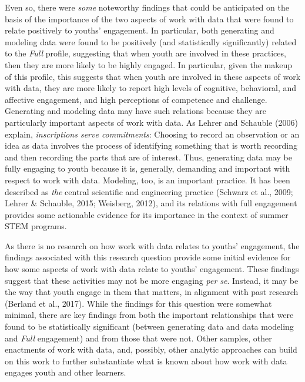 \documentclass[]{msu-thesis}
\theoremstyle{definition}
\theoremstyle{definition}
\theoremstyle{definition}
\theoremstyle{remark}
\begin{document}
Even so, there were \emph{some} noteworthy findings that could be
anticipated on the basis of the importance of the two aspects of work
with data that were found to relate positively to youths' engagement. In
particular, both generating and modeling data were found to be
positively (and statistically significantly) related to the \emph{Full}
profile, suggesting that when youth are involved in these practices,
then they are more likely to be highly engaged. In particular, given the
makeup of this profile, this suggests that when youth are involved in
these aspects of work with data, they are more likely to report high
levels of cognitive, behavioral, and affective engagement, and high
perceptions of competence and challenge. Generating and modeling data
may have such relations because they are particularly important aspects
of work with data. As Lehrer and Schauble (2006) explain,
\emph{inscriptions serve commitments}: Choosing to record an observation
or an idea as data involves the process of identifying something that is
worth recording and then recording the parts that are of interest. Thus,
generating data may be fully engaging to youth because it is, generally,
demanding and important with respect to work with data. Modeling, too,
is an important practice. It has been described as \emph{the} central
scientific and engineering practice (Schwarz et al., 2009; Lehrer \&
Schauble, 2015; Weisberg, 2012), and its relations with full engagement
provides some actionable evidence for its importance in the context of
summer STEM programs.

As there is no research on how work with data relates to youths'
engagement, the findings associated with this research question provide
some initial evidence for how some aspects of work with data relate to
youths' engagement. These findings suggest that these activities may not
be more engaging \emph{per se}. Instead, it may be the way that youth
engage in them that matters, in alignment with past research (Berland et
al., 2017). While the findings for this question were somewhat minimal,
there are key findings from both the important relationships that were
found to be statistically significant (between generating data and data
modeling and \emph{Full} engagement) and from those that were not. Other
samples, other enactments of work with data, and, possibly, other
analytic approaches can build on this work to further substantiate what
is known about how work with data engages youth and other learners.
\end{document}
